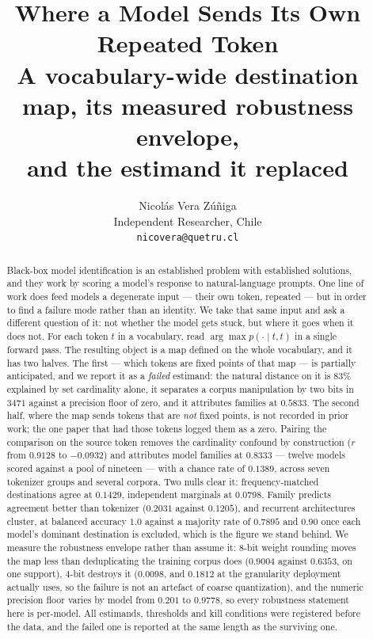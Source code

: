 \documentclass[11pt]{article}
\title{Where a Model Sends Its Own Repeated Token\\
{\large A vocabulary-wide destination map, its measured robustness envelope,\\and the estimand it
replaced}}
\author{Nicol\'as Vera Z\'u\~niga\\
Independent Researcher, Chile\\
\texttt{nicovera@quetru.cl}
}
\date{}
\begin{document}
\maketitle

\begin{abstract}
Black-box model identification is an established problem with established solutions, and they work
by scoring a model's response to natural-language prompts. One line of work does feed models a
degenerate input --- their own token, repeated --- but in order to find a failure mode rather than an
identity. We take that same input and ask a different question of it: not whether the model gets
stuck, but where it goes when it does not. For each token $t$ in a vocabulary, read
$\arg\max p(\cdot \mid t, t)$ in a single forward pass. The resulting object is a map defined on the
whole vocabulary, and it has two halves. The first --- which tokens are fixed points of that map ---
is partially anticipated, and we report it as a \emph{failed} estimand: the natural distance on it is
$83\%$ explained by set cardinality alone, it separates a corpus manipulation by two bits in $3471$
against a precision floor of zero, and it attributes families at $0.5833$. The second half, where the
map sends tokens that are \emph{not} fixed points, is not recorded in prior work; the one paper that
had those tokens logged them as a zero. Pairing the comparison on the source token removes the
cardinality confound by construction ($r$ from $0.9128$ to $-0.0932$) and attributes model families
at $0.8333$ --- twelve models scored against a pool of nineteen --- with a chance rate of
$0.1389$, across seven tokenizer groups and several corpora. Two nulls clear it: frequency-matched destinations agree at $0.1429$, independent marginals
at $0.0798$. Family predicts agreement better than tokenizer ($0.2031$ against $0.1205$), and
recurrent architectures cluster, at balanced accuracy $1.0$ against a majority rate of $0.7895$ and
$0.90$ once each model's dominant destination is excluded, which is the figure we stand behind. We
measure the robustness envelope rather than assume it: $8$-bit weight rounding moves the map less
than deduplicating the training corpus does ($0.9004$ against $0.6353$, on one support), $4$-bit destroys it
($0.0098$, and $0.1812$ at the granularity deployment actually uses, so the failure is not an
artefact of coarse quantization), and the numeric precision floor varies by model from $0.201$ to
$0.9778$, so every robustness statement here is per-model. All estimands, thresholds and kill conditions were registered
before the data, and the failed one is reported at the same length as the surviving one.
\end{abstract}
\end{document}
